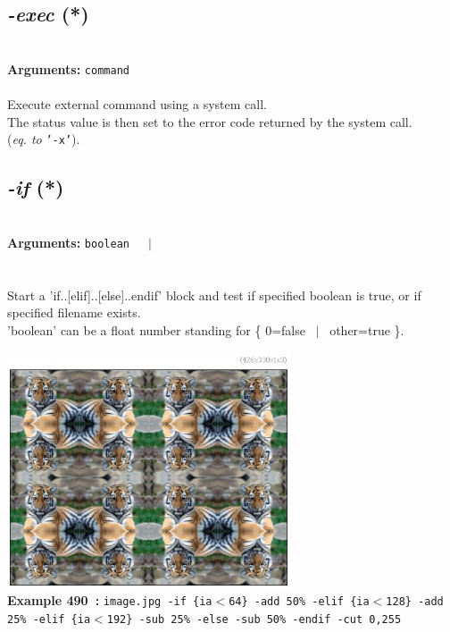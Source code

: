 \documentclass[a4paper,11pt,twoside]{book}
\begin{document}
\subsection{\emph{-exec} (*)}\vspace*{-0.5em}
~\\\textbf{Arguments: } 
{\small \texttt{command}}\\~\\
Execute external command using a system call.
~\\The status value is then set to the error code returned by the system call.
~\\(\emph{eq. to} {\small \texttt{'-x'}}).


\subsection{\emph{-if} (*)}\vspace*{-0.5em}
~\\\textbf{Arguments: } 
{\small \texttt{boolean}}~~~$|$\\
\\~\\
Start a 'if..[elif]..[else]..endif' block and test if specified boolean is true,
or if specified filename exists.
~\\'boolean' can be a float number standing for \{ 0=false ~$|$~ other=true \}.
\begin{center}\includegraphics[keepaspectratio=true,height=7cm,width=\textwidth]{img/gmic_def490.jpg}\\
{\footnotesize \textbf{Example 490~:} \texttt{image.jpg -if \{ia$<$64\} -add 50\% -elif \{ia$<$128\} -add 25\% -elif \{ia$<$192\} -sub 25\% -else -sub 50\% -endif -cut 0,255}}
\end{center}
\end{document}
